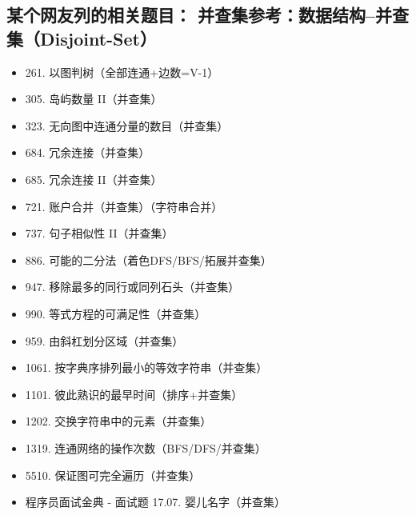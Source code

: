 \documentclass[9pt, b5paaper]{book}
\begin{document}
\subsection{某个网友列的相关题目： 并查集参考：数据结构–并查集（Disjoint-Set）}
\label{sec-10-0-9}
\begin{itemize}
\item 261. 以图判树（全部连通+边数=V-1）
\item 305. 岛屿数量 II（并查集）
\item 323. 无向图中连通分量的数目（并查集）
\item 684. 冗余连接（并查集）
\item 685. 冗余连接 II（并查集）
\item 721. 账户合并（并查集）（字符串合并）
\item 737. 句子相似性 II（并查集）
\item 886. 可能的二分法（着色DFS/BFS/拓展并查集）
\item 947. 移除最多的同行或同列石头（并查集）
\item 990. 等式方程的可满足性（并查集）
\item 959. 由斜杠划分区域（并查集）
\item 1061. 按字典序排列最小的等效字符串（并查集）
\item 1101. 彼此熟识的最早时间（排序+并查集）
\item 1202. 交换字符串中的元素（并查集）
\item 1319. 连通网络的操作次数（BFS/DFS/并查集）
\item 5510. 保证图可完全遍历（并查集）
\item 程序员面试金典 - 面试题 17.07. 婴儿名字（并查集）
\end{itemize}
\end{document}
